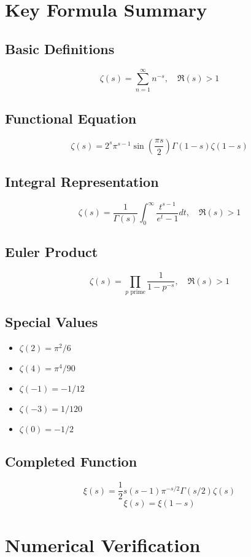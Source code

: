 \documentclass[11pt]{article}
\begin{document}
\appendix

\section{Key Formula Summary}

\subsection{Basic Definitions}
$$\zeta(s) = \sum_{n=1}^{\infty} n^{-s}, \quad \Re(s) > 1$$

\subsection{Functional Equation}
$$\zeta(s) = 2^s \pi^{s-1} \sin\left(\frac{\pi s}{2}\right) \Gamma(1-s) \zeta(1-s)$$

\subsection{Integral Representation}
$$\zeta(s) = \frac{1}{\Gamma(s)} \int_0^{\infty} \frac{t^{s-1}}{e^t - 1} dt, \quad \Re(s) > 1$$

\subsection{Euler Product}
$$\zeta(s) = \prod_{p \text{ prime}} \frac{1}{1 - p^{-s}}, \quad \Re(s) > 1$$

\subsection{Special Values}
\begin{itemize}
\item $\zeta(2) = \pi^2/6$
\item $\zeta(4) = \pi^4/90$
\item $\zeta(-1) = -1/12$
\item $\zeta(-3) = 1/120$
\item $\zeta(0) = -1/2$
\end{itemize}

\subsection{Completed Function}
$$\xi(s) = \frac{1}{2} s(s-1) \pi^{-s/2} \Gamma(s/2) \zeta(s)$$
$$\xi(s) = \xi(1-s)$$

\section{Numerical Verification}
\end{document}
